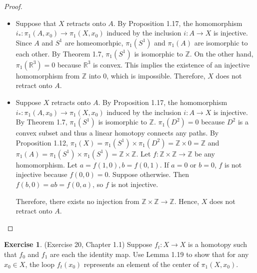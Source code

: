 \documentclass[12pt, psamsfonts]{amsart}
\theoremstyle{definition}
\newtheorem{exer}[thm]{Exercise}
\theoremstyle{remark}
\numberwithin{equation}{section}
\begin{document}
\begin{proof}
  $ $
  \begin{itemize}
    \item
      Suppose that $X$ retracts onto $A$.
      By Proposition 1.17, the homomorphism $i_*: \pi_1(A, x_0) \rightarrow \pi_1(X, x_0)$ induced by the inclusion $i: A \rightarrow X$ is injective.
      Since $A$ and $S^1$ are homeomorhpic, $\pi_1(S^1)$ and $\pi_1(A)$ are isomorphic to each other.
      By Theorem 1.7, $\pi_1(S^1)$ is isomorphic to $\mathbb{Z}$.
      On the other hand, $\pi_1(\mathbb{R}^3) = 0$ because $\mathbb{R}^3$ is convex.
      This implies the existence of an injective homomorphism from $\mathbb{Z}$ into $0$, which is impossible.
      Therefore, $X$ does not retract onto $A$.
    \item
      Suppose $X$ retracts onto $A$.
      By Proposition 1.17, the homomorphism $i_*: \pi_1(A, x_0) \rightarrow \pi_1(X, x_0)$ induced by the inclusion $i: A \rightarrow X$ is injective.
      By Theorem 1.7, $\pi_1(S^1)$ is isomorphic to $\mathbb{Z}$.
      $\pi_1(D^2) = 0$ because $D^2$ is a convex subset and thus a linear homotopy connects any paths.
      By Proposition 1.12, $\pi_1(X) = \pi_1(S^1) \times \pi_1(D^2) = \mathbb{Z} \times 0 = \mathbb{Z}$ and $\pi_1(A) = \pi_1(S^1) \times \pi_1(S^1) = \mathbb{Z} \times \mathbb{Z}$.
      Let $f: \mathbb{Z} \times \mathbb{Z} \rightarrow \mathbb{Z}$ be any homomorphism.
      Let $a = f(1, 0), b = f(0, 1)$.
      If $a = 0$ or $b = 0$, $f$ is not injective because $f(0, 0) = 0$.
      Suppose otherwise.
      Then $f(b, 0) = ab = f(0, a)$, so $f$ is not injective.

      Therefore, there exists no injection from $\mathbb{Z} \times \mathbb{Z} \rightarrow \mathbb{Z}$.
      Hence, $X$ does not retract onto $A$.
  \end{itemize}
\end{proof}

\begin{exer}{(Exercise 20, Chapter 1.1)}
  Suppose $f_t: X \rightarrow X$ is a homotopy such that $f_0$ and $f_1$ are each the identity map.
  Use Lemma 1.19 to show that for any $x_0 \in X$, the loop $f_t(x_0)$ represents an element of the center of $\pi_1(X, x_0)$.
\end{exer}
\end{document}
